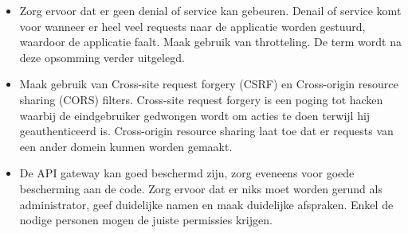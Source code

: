 \begin{itemize}
	\item Zorg ervoor dat er geen denial of service kan gebeuren. Denail of service komt voor wanneer er heel veel requests naar de applicatie worden gestuurd, waardoor de applicatie faalt. Maak gebruik van throtteling. De term wordt na deze opsomming verder uitgelegd.
	\item Maak gebruik van Cross-site request forgery (CSRF) en Cross-origin resource sharing (CORS) filters. Cross-site request forgery is een poging tot hacken waarbij de eindgebruiker gedwongen wordt om acties te doen terwijl hij geauthenticeerd is. Cross-origin resource sharing laat toe dat er requests van een ander domein kunnen worden gemaakt. 
	\item De API gateway kan goed beschermd zijn, zorg eveneens voor goede bescherming aan de code. Zorg ervoor dat er niks moet worden gerund als administrator, geef duidelijke namen en maak duidelijke afspraken. Enkel de nodige personen mogen de juiste permissies krijgen. 
\end{itemize}

